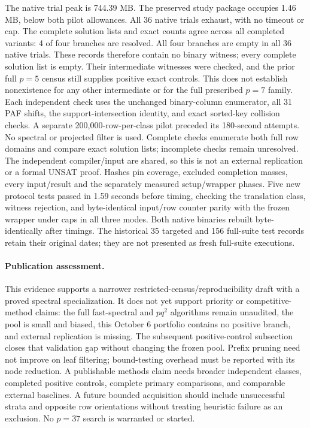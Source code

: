\documentclass[11pt]{article}
\begin{document}
The native trial peak is 744.39 MB. The preserved study package occupies 1.46 MB, below both pilot allowances. All 36 native trials exhaust, with no timeout or cap.
The complete solution lists and exact counts agree across all completed variants: 4 of four branches are resolved.
All four branches are empty in all 36 native trials. These records
therefore contain no binary witness; every complete solution list is empty.
Their intermediate witnesses were checked, and the prior full $p=5$ census
still supplies positive exact controls. This does not establish nonexistence
for any other intermediate or for the full prescribed $p=7$ family.
Each independent check uses the unchanged binary-column enumerator,
all 31 PAF shifts, the support-intersection identity, and exact sorted-key
collision checks. A separate 200,000-row-per-class pilot preceded its
180-second attempts. No spectral or projected filter is used. Complete
checks enumerate both full row domains and compare exact solution lists;
incomplete checks remain unresolved. The independent compiler/input are
shared, so this is not an external replication or a formal UNSAT proof.
Hashes pin coverage, excluded completion masses, every input/result and
the separately measured setup/wrapper phases.
Five new protocol tests passed in 1.59 seconds before timing, checking
the translation class, witness rejection, and byte-identical input/row
counter parity with the frozen wrapper under caps in all three modes.
Both native binaries rebuilt byte-identically after timings. The historical
35 targeted and 156 full-suite test records retain their original dates;
they are not presented as fresh full-suite executions.

\paragraph{Publication assessment.}
This evidence supports a narrower restricted-census/reproducibility draft
with a proved spectral specialization. It does not yet support priority or
competitive-method claims: the full fast-spectral and $pq^2$ algorithms
remain unaudited, the pool is small and biased, this October 6 portfolio
contains no positive branch, and external replication is missing. The
subsequent positive-control subsection closes that validation gap without
changing the frozen pool. Prefix pruning need
not improve on leaf filtering; bound-testing overhead must be reported with
its node reduction. A publishable methods claim needs broader independent
classes, completed positive controls, complete primary comparisons,
and comparable external baselines. A future bounded acquisition should
include unsuccessful strata and opposite row orientations without treating
heuristic failure as an exclusion. No $p=37$ search is warranted or started.
\end{document}
